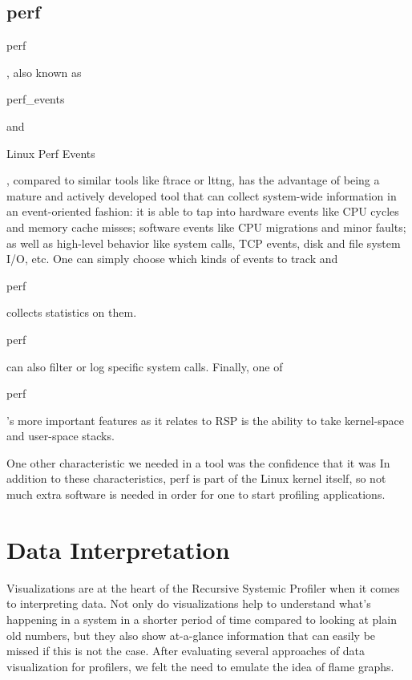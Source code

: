 \documentclass[10pt]{article}
\begin{document}
\subsection{perf}

\begin{tt}perf\end{tt}, also known as \begin{tt}perf\_events\end{tt} and \begin{tt}Linux Perf Events\end{tt}, compared to similar tools like ftrace or lttng, has the advantage of being a mature and actively developed tool that can collect system-wide information in an event-oriented fashion: it is able to tap into hardware events like CPU cycles and memory cache misses; software events like CPU migrations and minor faults; as well as high-level behavior like system calls, TCP events, disk and file system I/O, etc. One can simply choose which kinds of events to track and \begin{tt}perf\end{tt} collects statistics on them. \begin{tt}perf\end{tt} can also filter or log specific system calls. Finally, one of \begin{tt}perf\end{tt}'s more important features as it relates to RSP is the ability to take kernel-space and user-space stacks.

One other characteristic we needed in a tool was the confidence that it was  In addition to these characteristics, perf is part of the Linux kernel itself, so not much extra software is needed in order for one to start profiling applications.

\section{Data Interpretation}
Visualizations are at the heart of the Recursive Systemic Profiler when it comes to interpreting data. Not only do visualizations help to understand what's happening in a system in a shorter period of time compared to looking at plain old numbers, but they also show at-a-glance information that can easily be missed if this is not the case. After evaluating several approaches of data visualization for profilers, we felt the need to emulate the idea of flame graphs.
\end{document}
